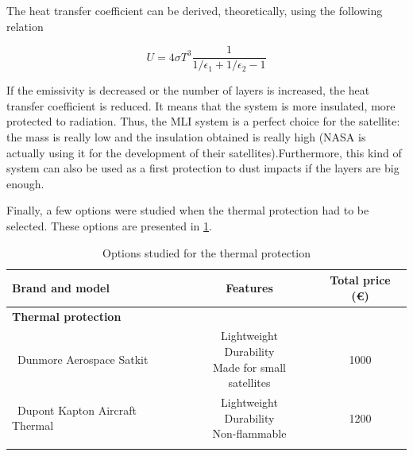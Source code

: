 The heat transfer coefficient can be derived, theoretically, using the following relation

\begin{equation}
U=4\sigma T^3 \frac{1}{1/\epsilon_{1}+1/ \epsilon_{2}-1}
\label{uderivation}
\end{equation}

If the emissivity is decreased or the number of layers is increased, the heat transfer coefficient is reduced. It means that the system is more insulated, more protected to radiation. Thus, the MLI system is a perfect choice for the satellite: the mass is really low and the insulation obtained is really high (NASA is actually using it for the development of their satellites).Furthermore, this kind of system can also be used as a first protection to dust impacts if the layers are big enough.

Finally, a few options were studied when the thermal protection had to be selected. These options are presented in \ref{thermaloptions}.

\begin{longtable}{| l | c | c | }
\hline
\rowcolor[gray]{0.80}	\textbf{Brand and model} &  \textbf{Features}     & \textbf{Total price (\euro)}   \\
\hline
\endfirsthead
\rowcolor[gray]{0.85} \textbf{Thermal protection} &  &  \\
	   ~Dunmore Aerospace Satkit & \makecell{Lightweight \\ Durability \\ Made for small satellites}& 1000 \\
	   \hline
	   ~Dupont Kapton Aircraft Thermal & \makecell{Lightweight \\ Durability \\ Non-flammable} & 1200 \\
	\hline

\caption{Options studied for the thermal protection}
\label{thermaloptions}
\end{longtable}